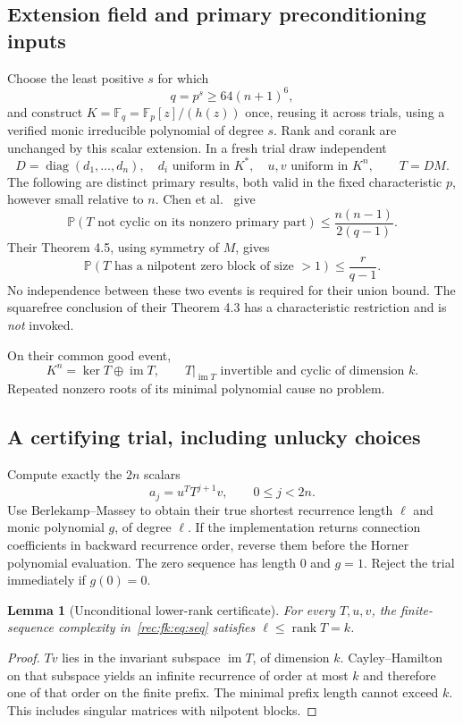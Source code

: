 \documentclass[11pt]{article}
\newtheorem{lemma}[theorem]{Lemma}
\theoremstyle{definition}
\theoremstyle{remark}
\newcommand{\1}{\mathbf 1}
\providecommand{\Prob}{\mathbb P}
\providecommand{\F}{\mathbb F}
\providecommand{\rank}{\operatorname{rank}}
\begin{document}
\subsection{Extension field and primary preconditioning inputs}
Choose the least positive $s$ for which
\[
 q=p^s\ge64(n+1)^6,
\]
and construct $K=\F_q=\F_p[z]/(h(z))$ once, reusing it across trials,
using a verified monic irreducible polynomial of degree $s$.
Rank and corank are unchanged
by this scalar extension.
In a fresh trial draw independent
\[
 D=\operatorname{diag}(d_1,\ldots,d_n),\quad d_i\text{ uniform in }K^*,
 \quad u,v\text{ uniform in }K^n,\qquad T=DM.
\]
The following are distinct primary results, both valid in the fixed
characteristic $p$, however small relative to $n$.
Chen et al.\ \cite[Theorem 4.2]{rec:Chen} give
\begin{equation}\label{rec:fk:eq:cyc}
 \Prob(T\text{ not cyclic on its nonzero primary part})
 \le\frac{n(n-1)}{2(q-1)}.
\end{equation}
Their Theorem 4.5, using symmetry of $M$, gives
\begin{equation}\label{rec:fk:eq:nil}
 \Prob(T\text{ has a nilpotent zero block of size }>1)
 \le\frac r{q-1}.
\end{equation}
No independence between these two events is required for their union
bound. The squarefree conclusion of their Theorem 4.3 has a
characteristic restriction and is \emph{not} invoked.

On their common good event,
\[
 K^n=\ker T\oplus\operatorname{im}T,
 \qquad T|_{\operatorname{im}T}\text{ invertible and cyclic of dimension }k.
\]
Repeated nonzero roots of its minimal polynomial cause no problem.

\subsection{A certifying trial, including unlucky choices}
Compute exactly the $2n$ scalars
\begin{equation}\label{rec:fk:eq:seq}
 a_j=u^TT^{j+1}v,\qquad 0\le j<2n.
\end{equation}
Use Berlekamp--Massey to obtain their true shortest recurrence length
$\ell$ and monic polynomial $g$, of degree $\ell$.
If the implementation returns connection coefficients in backward
recurrence order, reverse them before the Horner polynomial evaluation.
The zero sequence has length $0$ and $g=1$.
Reject the trial immediately if $g(0)=0$.

\begin{lemma}[Unconditional lower-rank certificate]\label{rec:fk:lem:lower}
For every $T,u,v$, the finite-sequence complexity in~\eqref{rec:fk:eq:seq}
satisfies $\ell\le\rank T=k$.
\end{lemma}
\begin{proof}
$Tv$ lies in the invariant subspace $\operatorname{im}T$, of
dimension $k$. Cayley--Hamilton on that subspace yields an infinite
recurrence of order at most $k$ and therefore one of that order on
the finite prefix. The minimal prefix length cannot exceed $k$.
This includes singular matrices with nilpotent blocks.
\end{proof}
\end{document}

